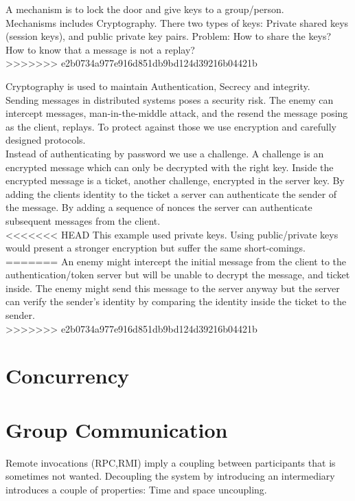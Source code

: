 A mechanism is to lock the door and give keys to a group/person.\\

Mechanisms includes Cryptography. There two types of keys: Private shared keys (session keys), and public private key pairs. Problem: How to share the keys? How to know that a message is not a replay?\\
>>>>>>> e2b0734a977e916d851db9bd124d39216b04421b

Cryptography is used to maintain Authentication, Secrecy and integrity. \\

Sending messages in distributed systems poses a security risk. The enemy can intercept messages, man-in-the-middle attack, and the resend the message posing as the client, replays. To protect against those we use encryption and carefully designed protocols. \\

Instead of authenticating by password we use a challenge. A challenge is an encrypted message which can only be decrypted with the right key. Inside the encrypted message is a ticket, another challenge, encrypted in the server key. By adding the clients identity to the ticket a server can authenticate the sender of the message. By adding a sequence of nonces the server can authenticate subsequent messages from the client.\\

<<<<<<< HEAD
This example used private keys. Using public/private keys would present a stronger encryption but suffer the same short-comings. \\
=======
An enemy might intercept the initial message from the client to the authentication/token server but will be unable to decrypt the message, and ticket inside. The enemy might send this message to the server anyway but the server can verify the sender's identity by comparing the identity inside the ticket to the sender. \\
>>>>>>> e2b0734a977e916d851db9bd124d39216b04421b


\section{Concurrency}
\section{Group Communication}
Remote invocations (RPC,RMI) imply a coupling between participants that is sometimes not wanted. Decoupling the system by introducing an intermediary introduces a couple of properties: Time and space uncoupling.\\

